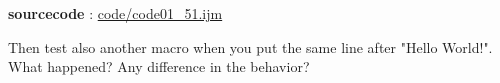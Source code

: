 \textbf{sourcecode} : \href{http://www.example.com/contents}{code/code01\_51.ijm}

Then test also another macro when you put the same line after "Hello World!". 
What happened? Any difference in the behavior? 
\item
